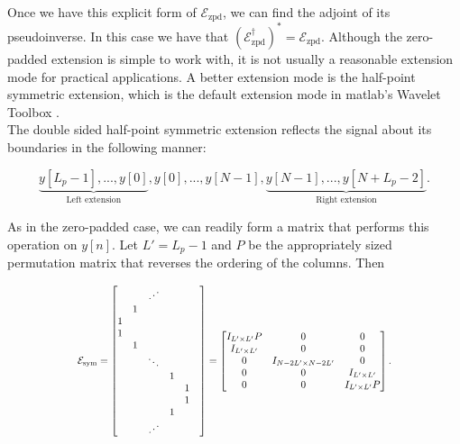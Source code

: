 \documentclass[journal]{IEEEtran}
\newcommand\scalemath[2]{\scalebox{#1}{\mbox{\ensuremath{\displaystyle #2}}}}
\begin{document}
\noindent Once we have this explicit form of $\mathcal{E}_\text{zpd}$, we can find the adjoint of its pseudoinverse.  In this case we have that $\left(\mathcal{E}_\text{zpd}^\dagger\right)^\ast = \mathcal{E}_\text{zpd}$.  Although the zero-padded extension is simple to work with, it is not usually a reasonable extension mode for practical applications.  A better extension mode is the half-point symmetric extension, which is the default extension mode in {\sc matlab}'s Wavelet Toolbox \cite{matlab_wt_2015}.\\

The double sided half-point symmetric extension reflects the signal about its boundaries in the following manner:

\[ \underbrace{y[L_p-1], ..., y[0]}_\text{Left extension}, y[0], ..., y[N-1], \underbrace{y[N-1], ..., y[N+L_p-2]}_\text{Right extension}. \] 

\noindent As in the zero-padded case, we can readily form a matrix that performs this operation on $y[n]$.  Let $L'=L_p-1$ and $P$ be the appropriately sized permutation matrix that reverses the ordering of the columns.  Then

\[ \scalemath{0.8}{\mathcal{E}_\text{sym} = \begin{bmatrix} & & \iddots & & &\\ & 1 &&&&\\ 1&&&&&\\1&&&&\\&1&&&&\\&&\ddots&&&\\&&&1&\\&&&&1\\&&&&1\\&&&1&\\&&\iddots&&\end{bmatrix} = \begin{bmatrix}I_{L'\times L'}P & 0 & 0\\I_{L'\times L'} & 0 & 0\\0 & I_{N-2L'\times N-2L'} & 0\\0&0&I_{L'\times L'}\\0&0&I_{L'\times L'}P\end{bmatrix}.} \]
\end{document}

